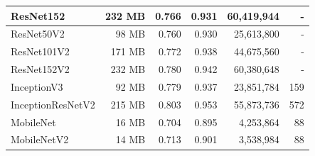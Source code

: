\begin{table}[h!]
\begin{tabular}{|l|r|r|r|r|r|}
    ResNet152         & 232 MB                             & 0.766                                                                                   & 0.931                                                                                   & 60,419,944                               & -                                   \\ \hline
    ResNet50V2        & 98 MB                              & 0.760                                                                                   & 0.930                                                                                   & 25,613,800                               & -                                   \\ \hline
    ResNet101V2       & 171 MB                             & 0.772                                                                                   & 0.938                                                                                   & 44,675,560                               & -                                   \\ \hline
    ResNet152V2       & 232 MB                             & 0.780                                                                                   & 0.942                                                                                   & 60,380,648                               & -                                   \\ \hline
    InceptionV3       & 92 MB                              & 0.779                                                                                   & 0.937                                                                                   & 23,851,784                               & 159                                 \\ \hline
    InceptionResNetV2 & 215 MB                             & 0.803                                                                                   & 0.953                                                                                   & 55,873,736                               & 572                                 \\ \hline
    MobileNet         & 16 MB                              & 0.704                                                                                   & 0.895                                                                                   & 4,253,864                                & 88                                  \\ \hline
    MobileNetV2       & 14 MB                              & 0.713                                                                                   & 0.901                                                                                   & 3,538,984                                & 88                                  \\ \hline

\end{tabular}
\end{table}
